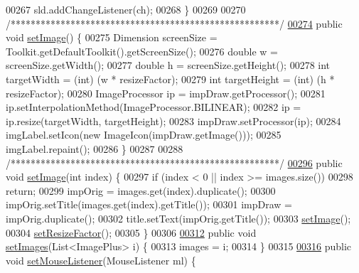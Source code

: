 \begin{DoxyCode}
{00267     sld.addChangeListener(ch);
00268   \}
00269 
00270   \textcolor{comment}{/******************************************************/}
\hypertarget{_image_analysis_window_8java_source_l00274}{}\hyperlink{classgui_1_1_image_analysis_window_a3e14b1197961eed6fd530110e15380ec}{00274}   \textcolor{keyword}{public} \textcolor{keywordtype}{void} \hyperlink{classgui_1_1_image_analysis_window_a3e14b1197961eed6fd530110e15380ec}{setImage}() \{
00275     Dimension screenSize = Toolkit.getDefaultToolkit().getScreenSize();
00276     \textcolor{keywordtype}{double} w = screenSize.getWidth();
00277     \textcolor{keywordtype}{double} h = screenSize.getHeight();
00278     \textcolor{keywordtype}{int} targetWidth = (int) (w * resizeFactor);
00279     \textcolor{keywordtype}{int} targetHeight = (int) (h * resizeFactor);
00280     ImageProcessor ip = impDraw.getProcessor();
00281     ip.setInterpolationMethod(ImageProcessor.BILINEAR);
00282     ip = ip.resize(targetWidth, targetHeight);
00283     impDraw.setProcessor(ip);
00284     imgLabel.setIcon(\textcolor{keyword}{new} ImageIcon(impDraw.getImage()));
00285     imgLabel.repaint();
00286   \}
00287 
00288   \textcolor{comment}{/******************************************************/}
\hypertarget{_image_analysis_window_8java_source_l00296}{}\hyperlink{classgui_1_1_image_analysis_window_a04b5ca8d2004b3a622268e038a238455}{00296}   \textcolor{keyword}{public} \textcolor{keywordtype}{void} \hyperlink{classgui_1_1_image_analysis_window_a04b5ca8d2004b3a622268e038a238455}{setImage}(\textcolor{keywordtype}{int} index) \{
00297     \textcolor{keywordflow}{if} (index < 0 || index >= images.size())
00298       \textcolor{keywordflow}{return};
00299     impOrig = images.get(index).duplicate();
00300     impOrig.setTitle(images.get(index).getTitle());
00301     impDraw = impOrig.duplicate();
00302     title.setText(impOrig.getTitle());
00303     \hyperlink{classgui_1_1_image_analysis_window_a3e14b1197961eed6fd530110e15380ec}{setImage}();
00304     \hyperlink{classgui_1_1_image_analysis_window_aa8880ccb12f2638822de16dd50e9c6d1}{setResizeFactor}();
00305   \}
00306 
\hypertarget{_image_analysis_window_8java_source_l00312}{}\hyperlink{classgui_1_1_image_analysis_window_a68997c66ca7a19a6676411bba4640aef}{00312}   \textcolor{keyword}{public} \textcolor{keywordtype}{void} \hyperlink{classgui_1_1_image_analysis_window_a68997c66ca7a19a6676411bba4640aef}{setImages}(List<ImagePlus> i) \{
00313     images = i;
00314   \}
00315 
\hypertarget{_image_analysis_window_8java_source_l00316}{}\hyperlink{classgui_1_1_image_analysis_window_a966ff4422076de6f1bb590cdcbbb03ca}{00316}   \textcolor{keyword}{public} \textcolor{keywordtype}{void} \hyperlink{classgui_1_1_image_analysis_window_a966ff4422076de6f1bb590cdcbbb03ca}{setMouseListener}(MouseListener ml) \{
}
\end{DoxyCode}
